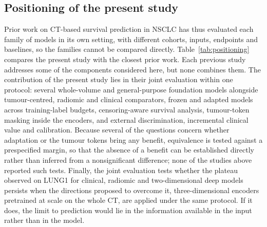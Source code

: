 \subsection{Positioning of the present study}\label{sec:related-position}
Prior work on CT-based survival prediction in NSCLC has thus evaluated each family of models in its own setting, with different cohorts, inputs, endpoints and baselines, so the families cannot be compared directly. Table~\ref{tab:positioning} compares the present study with the closest prior work. Each previous study addresses some of the components considered here, but none combines them. The contribution of the present study lies in their joint evaluation within one protocol: several whole-volume and general-purpose foundation models alongside tumour-centred, radiomic and clinical comparators, frozen and adapted models across training-label budgets, censoring-aware survival analysis, tumour-token masking inside the encoders, and external discrimination, incremental clinical value and calibration. Because several of the questions concern whether adaptation or the tumour tokens bring any benefit, equivalence is tested against a prespecified margin, so that the absence of a benefit can be established directly rather than inferred from a nonsignificant difference; none of the studies above reported such tests. Finally, the joint evaluation tests whether the plateau observed on LUNG1 for clinical, radiomic and two-dimensional deep models persists when the directions proposed to overcome it, three-dimensional encoders pretrained at scale on the whole CT, are applied under the same protocol. If it does, the limit to prediction would lie in the information available in the input rather than in the model.

